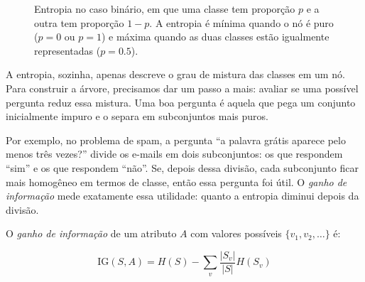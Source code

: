 \documentclass[12pt,a4paper]{article}
\begin{document}
\begin{figure}[ht]
\centering
{}
\caption{Entropia no caso binário, em que uma classe tem proporção $p$ e a outra tem proporção $1-p$. A entropia é mínima quando o nó é puro ($p=0$ ou $p=1$) e máxima quando as duas classes estão igualmente representadas ($p=0.5$).}
\label{fig:entropia-binaria}
\end{figure}

A entropia, sozinha, apenas descreve o grau de mistura das classes em um nó. Para construir a árvore, precisamos dar um passo a mais: avaliar se uma possível pergunta reduz essa mistura. Uma boa pergunta é aquela que pega um conjunto inicialmente impuro e o separa em subconjuntos mais puros.

Por exemplo, no problema de spam, a pergunta ``a palavra grátis aparece pelo menos três vezes?'' divide os e-mails em dois subconjuntos: os que respondem ``sim'' e os que respondem ``não''. Se, depois dessa divisão, cada subconjunto ficar mais homogêneo em termos de classe, então essa pergunta foi útil. O \emph{ganho de informação} mede exatamente essa utilidade: quanto a entropia diminui depois da divisão.

O \emph{ganho de informação} de um atributo $A$ com valores possíveis $\{v_1, v_2, \ldots\}$ é:

\[
\text{IG}(S, A) = H(S) - \sum_v \frac{|S_v|}{|S|} H(S_v)
\]
\end{document}
